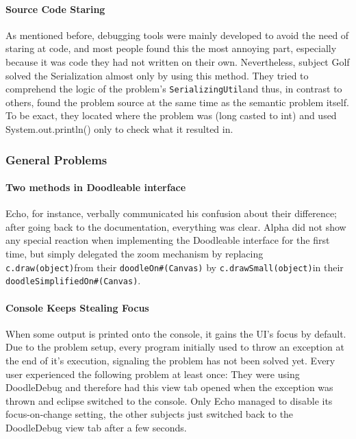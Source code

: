 \documentclass[english]{acm_proc_article-sp}
\newcommand\nes[1]{\nbc{nes}{#1}{blue}}
\begin{document}
\paragraph{Source Code Staring}
As mentioned before, debugging tools were mainly developed to avoid the need of staring at code, and most people found this the most annoying part, especially because it was code they had not written on their own. 
Nevertheless, subject Golf solved the Serialization almost only by using this method. 
They tried to comprehend the logic of the problem's \texttt{SerializingUtil}and thus, in contrast to others, found the problem source at the same time as the semantic problem itself. 
To be exact, they located where the problem was (long casted to int) and used System.out.println() only to check what it resulted in.

\subsubsection{General Problems}
\paragraph{Two methods in Doodleable interface}
Echo, for instance, verbally communicated his confusion about their difference; after going back to the documentation, everything was clear.\nes{This goes into the study.}
Alpha did not show any special reaction when implementing the Doodleable interface for the first time, but simply delegated the zoom mechanism by replacing \texttt{c.draw(object)}from their \texttt{doodleOn\#(Canvas)} 
by \texttt{c.drawSmall(object)}in their \texttt{doodleSimplifiedOn\#(Canvas)}.

\paragraph{Console Keeps Stealing Focus}
\label{console-focus-problem}
When some output is printed onto the console, it gains the UI's focus by default. 
Due to the problem setup, every program initially used to throw an exception at the end of it's execution, signaling the problem has not been solved yet. 
Every user experienced the following problem at least once: They were using DoodleDebug and therefore had this view tab opened when the exception was thrown and eclipse switched to the console. 
Only Echo managed to disable its focus-on-change setting, the other subjects just switched back to the DoodleDebug view tab after a few seconds.
\end{document}
